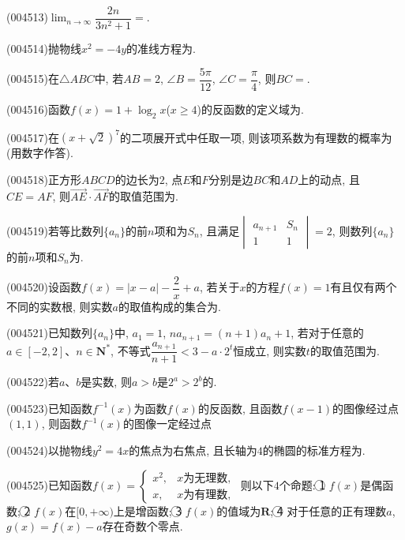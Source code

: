 \item (004513)$\displaystyle\lim_{n\to \infty}\dfrac{2n}{3{n^2}+1}=$.
\item (004514)抛物线$x^2=-4y$的准线方程为.
\item (004515)在$\triangle ABC$中, 若$AB=2$, $\angle B=\dfrac{5\pi}{12}$, $\angle C=\dfrac{\pi}4$, 则$BC=$.
\item (004516)函数$f(x)=1+\log_2x$($x\ge 4$)的反函数的定义域为.
\item (004517)在$(x+\sqrt 2)^7$的二项展开式中任取一项, 则该项系数为有理数的概率为(用数字作答).
\item (004518)正方形$ABCD$的边长为$2$, 点$E$和$F$分别是边$BC$和$AD$上的动点, 且$CE=AF$, 则$\overrightarrow{AE}\cdot \overrightarrow{AF}$的取值范围为.
\item (004519)若等比数列$\{a_n\}$的前$n$项和为$S_n$, 且满足$\begin{vmatrix}
a_{n+1} &  S_n  \\ 1 & 1  \end{vmatrix}=2$, 则数列$\{a_n\}$的前$n$项和$S_n$为.
\item (004520)设函数$f(x)=|x-a|-\dfrac 2x+a$, 若关于$x$的方程$f(x)=1$有且仅有两个不同的实数根, 则实数$a$的取值构成的集合为.
\item (004521)已知数列$\{a_n\}$中, $a_1=1$, $na_{n+1}=(n+1)a_n+1$, 若对于任意的$a\in [-2,2]$、$n\in \mathbf{N}^*$, 不等式$\dfrac{a_{n+1}}{n+1}<3-a\cdot {2^t}$恒成立, 则实数$t$的取值范围为.
\item (004522)若$a$、$b$是实数, 则$a>b$是$2^a>2^b$的.
\item (004523)已知函数$f^{-1}(x)$为函数$f(x)$的反函数, 且函数$f(x-1)$的图像经过点$(1,1)$, 则函数$f^{-1}(x)$的图像一定经过点
\item (004524)以抛物线$y^2=4x$的焦点为右焦点, 且长轴为$4$的椭圆的标准方程为.
\item (004525)已知函数$f(x)=\begin{cases} x^2, & x\text{为无理数}, \\ x, &x\text{为有理数},   \end{cases}$ 则以下$4$个命题:
\textcircled{1} $f(x)$是偶函数; \textcircled{2} $f(x)$在$[0,+\infty)$上是增函数; \textcircled{3} $f(x)$的值域为$\mathbf{R}$; \textcircled{4} 对于任意的正有理数$a$, $g(x)=f(x)-a$存在奇数个零点.
